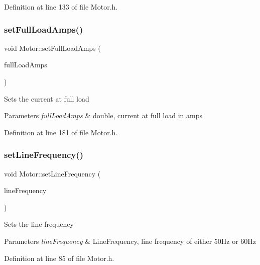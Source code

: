 Definition at line 133 of file Motor.\+h.

\mbox{\label{class_motor_a4bc8bf85c7749a0b7ff279d7eef20a2e}} 
\subsubsection{\texorpdfstring{set\+Full\+Load\+Amps()}{setFullLoadAmps()}}
{\footnotesize\ttfamily void Motor\+::set\+Full\+Load\+Amps (\begin{DoxyParamCaption}\item[{double}]{full\+Load\+Amps }\end{DoxyParamCaption})\hspace{0.3cm}{\ttfamily [inline]}}

Sets the current at full load 
\begin{DoxyParams}{Parameters}
{\em full\+Load\+Amps} & double, current at full load in amps \\
\hline
\end{DoxyParams}


Definition at line 181 of file Motor.\+h.

\mbox{\label{class_motor_a450e5ecea25b05413b731379f153c3f1}} 
\subsubsection{\texorpdfstring{set\+Line\+Frequency()}{setLineFrequency()}}
{\footnotesize\ttfamily void Motor\+::set\+Line\+Frequency (\begin{DoxyParamCaption}\item[{Line\+Frequency}]{line\+Frequency }\end{DoxyParamCaption})\hspace{0.3cm}{\ttfamily [inline]}}

Sets the line frequency 
\begin{DoxyParams}{Parameters}
{\em line\+Frequency} & Line\+Frequency, line frequency of either 50\+Hz or 60\+Hz \\
\hline
\end{DoxyParams}


Definition at line 85 of file Motor.\+h.

